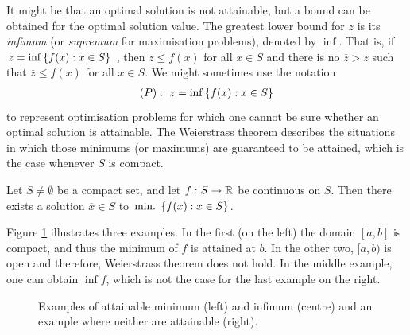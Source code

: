 It might be that an optimal solution is not attainable, but a bound can be obtained for the optimal solution value. The greatest lower bound for $z$ is its \emph{infimum} (or \emph{supremum} for maximisation problems), denoted by $\inf$. That is, if $z = \inf\left\{ f(x) : x \in S \right \}$ , then $z \leq f(x)$ for all $x \in S$ and there is no $\overline{z} > z$ such that $\overline{z} \leq f(x)$ for all $x \in S$. We might sometimes use the notation 
%
\begin{align*}
(P) :~ z = \inf\left\{ f(x) : x \in S \right \}
\end{align*}
%
to represent optimisation problems for which one cannot be sure whether an optimal solution is attainable. The Weierstrass theorem describes the situations in which those minimums (or maximums) are guaranteed to be attained, which is the case whenever $S$ is compact.
%
\begin{theorem}\label{thm:weierstrass}
Let $S \neq \emptyset$ be a compact set, and let $f:S \rightarrow \mathbb{R}$ be continuous on $S$. Then there exists a solution $\overline{x} \in S$ to $\mathop{\text{min.~}}\left\{ f(x) : x \in S \right \}$. 
\end{theorem}
%
Figure \ref{fig:Weierstrass} illustrates three examples. In the first (on the left) the domain $[a,b]$ is compact, and thus the minimum of $f$ is attained at $b$. In the other two, $[a,b)$ is open and therefore, Weierstrass theorem does not hold. In the middle example, one can obtain $\inf f$, which is not the case for the last example on the right.
%
\begin{figure}[h]
	\caption{Examples of attainable minimum (left) and infimum (centre) and an example where neither are attainable (right).} \label{fig:Weierstrass}
\end{figure}


